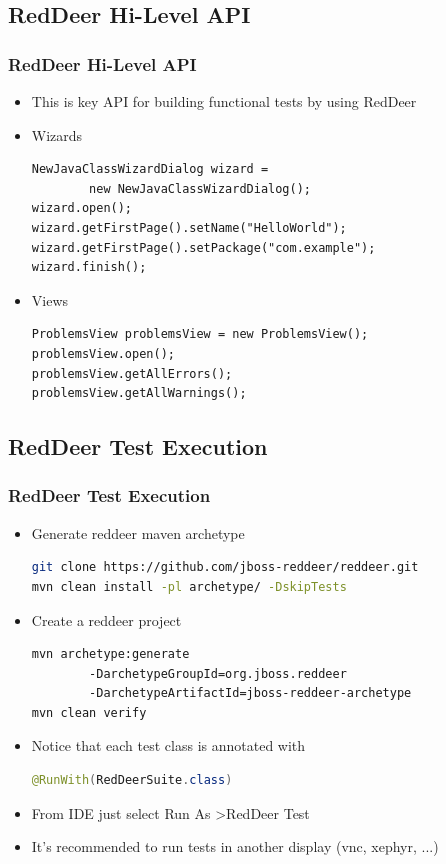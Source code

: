 \documentclass{beamer}
\begin{document}
\subsection{RedDeer Hi-Level API}
\begin{frame}[fragile]
\frametitle{RedDeer Hi-Level API}
\begin{itemize}
\item This is key API for building functional tests by using RedDeer
\item Wizards
\begin{lstlisting}
NewJavaClassWizardDialog wizard =
        new NewJavaClassWizardDialog();
wizard.open();
wizard.getFirstPage().setName("HelloWorld");
wizard.getFirstPage().setPackage("com.example");
wizard.finish();
\end{lstlisting}
\item Views
\begin{lstlisting}
ProblemsView problemsView = new ProblemsView();
problemsView.open();
problemsView.getAllErrors();
problemsView.getAllWarnings();
\end{lstlisting}
\end{itemize}
\end{frame}

\subsection{RedDeer Test Execution}
\begin{frame}[fragile]
\frametitle{RedDeer Test Execution}
\begin{itemize}
\item Generate reddeer maven archetype
\begin{lstlisting}[language=sh]
git clone https://github.com/jboss-reddeer/reddeer.git
mvn clean install -pl archetype/ -DskipTests
\end{lstlisting}
\item Create a reddeer project
\begin{lstlisting}[language=sh]
mvn archetype:generate 
        -DarchetypeGroupId=org.jboss.reddeer
        -DarchetypeArtifactId=jboss-reddeer-archetype
mvn clean verify
\end{lstlisting}
\item Notice that each test class is annotated with
\begin{lstlisting}[language=Java]
@RunWith(RedDeerSuite.class)
\end{lstlisting}
\item From IDE just select Run As \textgreater RedDeer Test
\item It's recommended to run tests in another display (vnc, xephyr, ...)
\end{itemize}
\end{frame}
\end{document}
